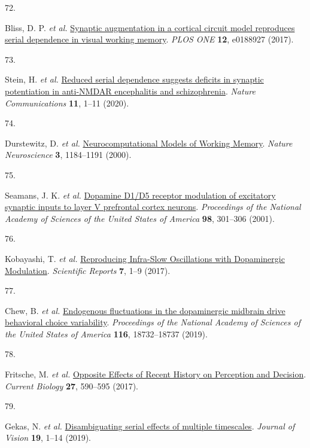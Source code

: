 \documentclass[
]{article}
\newlength{\cslhangindent}
\newlength{\csllabelwidth}
\newlength{\cslentryspacingunit} %
\newenvironment{CSLReferences}[2] %
 {%
  \setlength{\parindent}{0pt}
  \ifodd #1
  \let\oldpar\par
  \def\par{\hangindent=\cslhangindent\oldpar}
  \fi
  \setlength{\parskip}{#2\cslentryspacingunit}
 }%
 {}
\newcommand{\CSLLeftMargin}[1]{\parbox[t]{\csllabelwidth}{#1}}
\newcommand{\CSLRightInline}[1]{\parbox[t]{\linewidth - \csllabelwidth}{#1}\break}
\begin{document}
\begin{CSLReferences}{0}{0}
\leavevmode{}%
\CSLLeftMargin{72. }%
\CSLRightInline{Bliss, D. P. \emph{et al.}
\href{https://doi.org/10.1371/journal.pone.0188927}{{Synaptic
augmentation in a cortical circuit model reproduces serial dependence in
visual working memory}}. \emph{PLOS ONE} \textbf{12}, e0188927 (2017).}

\leavevmode{}%
\CSLLeftMargin{73. }%
\CSLRightInline{Stein, H. \emph{et al.}
\href{https://doi.org/10.1038/s41467-020-18033-3}{{Reduced serial
dependence suggests deficits in synaptic potentiation in anti-NMDAR
encephalitis and schizophrenia}}. \emph{Nature Communications}
\textbf{11}, 1--11 (2020).}

\leavevmode{}%
\CSLLeftMargin{74. }%
\CSLRightInline{Durstewitz, D. \emph{et al.}
\href{https://doi.org/10.1038/81460}{{Neurocomputational Models of
Working Memory}}. \emph{Nature Neuroscience} \textbf{3}, 1184--1191
(2000).}

\leavevmode{}%
\CSLLeftMargin{75. }%
\CSLRightInline{Seamans, J. K. \emph{et al.}
\href{https://doi.org/10.1073/pnas.98.1.301}{{Dopamine D1/D5 receptor
modulation of excitatory synaptic inputs to layer V prefrontal cortex
neurons}}. \emph{Proceedings of the National Academy of Sciences of the
United States of America} \textbf{98}, 301--306 (2001).}

\leavevmode{}%
\CSLLeftMargin{76. }%
\CSLRightInline{Kobayashi, T. \emph{et al.}
\href{https://doi.org/10.1038/s41598-017-02366-z}{{Reproducing
Infra-Slow Oscillations with Dopaminergic Modulation}}. \emph{Scientific
Reports} \textbf{7}, 1--9 (2017).}

\leavevmode{}%
\CSLLeftMargin{77. }%
\CSLRightInline{Chew, B. \emph{et al.}
\href{https://doi.org/10.1073/pnas.1900872116}{{Endogenous fluctuations
in the dopaminergic midbrain drive behavioral choice variability}}.
\emph{Proceedings of the National Academy of Sciences of the United
States of America} \textbf{116}, 18732--18737 (2019).}

\leavevmode{}%
\CSLLeftMargin{78. }%
\CSLRightInline{Fritsche, M. \emph{et al.}
\href{https://doi.org/10.1016/j.cub.2017.01.006}{{Opposite Effects of
Recent History on Perception and Decision}}. \emph{Current Biology}
\textbf{27}, 590--595 (2017).}

\leavevmode{}%
\CSLLeftMargin{79. }%
\CSLRightInline{Gekas, N. \emph{et al.}
\href{https://doi.org/10.1167/19.6.24}{{Disambiguating serial effects of
multiple timescales}}. \emph{Journal of Vision} \textbf{19}, 1--14
(2019).}


\end{CSLReferences}
\end{document}
